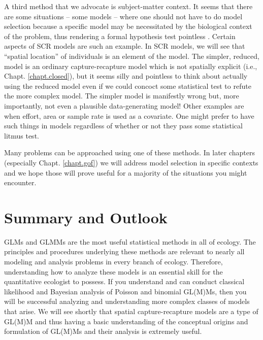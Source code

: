 A third method that we advocate is subject-matter context. It seems
that there are some situations -- some models -- where one should not
have to do model selection because a specific model may be 
necessitated by the biological 
context of the problem, thus rendering a formal hypothesis test
pointless \citep{johnson:1999}.  Certain aspects of SCR models are
such an example. In SCR models, we will see that ``spatial location''
of individuals is an element of the model. The simpler, reduced, model
is an ordinary capture-recapture model which is not spatially explicit
(i.e., Chapt. \ref{chapt.closed}), but it seems silly and pointless to
think about actually using the reduced model even if we could concoct
some statistical test to refute the more complex model.  The simpler
model is manifestly wrong but, more importantly, not even a plausible
data-generating model!  Other examples are when effort, area or sample
rate is used as a covariate. One might prefer to have such things in
models regardless of whether or not they pass some statistical litmus
test.

Many problems can be approached using one of these methods.
In later chapters (especially Chapt. \ref{chapt.gof}) we
will address model selection in specific contexts and we hope those
will prove useful for a majority of the situations you might
encounter.



\section{ Summary and Outlook}

GLMs and GLMMs are the most useful statistical methods in all of
ecology. The principles and procedures underlying these methods are
relevant to nearly all modeling and analysis problems in every branch
of ecology. Therefore, understanding how to analyze these models is
an essential skill for the quantitative ecologist to possess.
 If you understand and
can conduct classical likelihood and Bayesian analysis of Poisson and
binomial GL(M)Ms, then you will be successful analyzing and
understanding more complex classes of models that arise. We will see
shortly that spatial capture-recapture models are a type of GL(M)M
and thus having a basic
understanding of the conceptual origins and formulation of GL(M)Ms and
their analysis is extremely useful.

